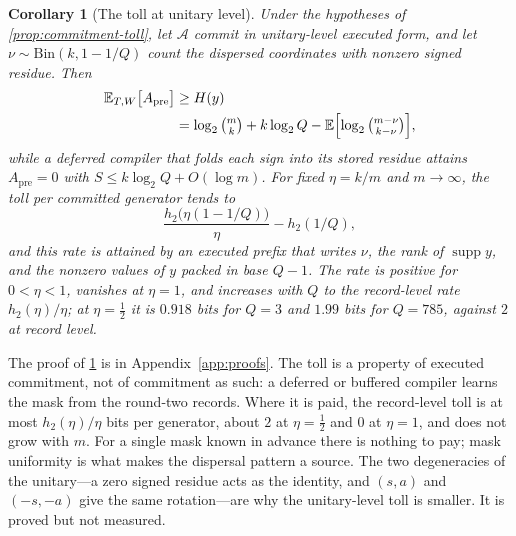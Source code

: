 \documentclass[aps,prx,reprint,superscriptaddress,floatfix,longbibliography]{revtex4-2}
\newtheorem{corollary}{Corollary}
\begin{document}
\begin{corollary}[The toll at unitary level]
\label{cor:unitary-toll}
Under the hypotheses of \cref{prop:commitment-toll}, let $\mathcal A$
commit in unitary-level executed form, and let
$\nu\sim\mathrm{Bin}(k,1-1/Q)$ count the dispersed coordinates with
nonzero signed residue.  Then
\begin{equation}\label{eq:unitary-toll}
\begin{aligned}
 \mathbb E_{T,W}\bigl[A_{\mathrm{pre}}\bigr]
 &\geq H(y)\\
 &=\log_2\tbinom{m}{k}+k\log_2Q
 -\mathbb E\Bigl[\log_2\tbinom{m-\nu}{k-\nu}\Bigr],
\end{aligned}
\end{equation}
while a deferred compiler that folds each sign into its stored residue
attains $A_{\mathrm{pre}}=0$ with $S\leq k\log_2Q+O(\log m)$.  For fixed
$\eta=k/m$ and $m\to\infty$, the toll per committed generator tends to
\begin{equation}\label{eq:unitary-toll-rate}
 \frac{h_2\bigl(\eta(1-1/Q)\bigr)}{\eta}-h_2(1/Q),
\end{equation}
and this rate is attained by an executed prefix that writes $\nu$, the
rank of $\operatorname{supp}y$, and the nonzero values of $y$ packed in
base $Q-1$.  The rate
is positive for $0<\eta<1$, vanishes at $\eta=1$, and increases with $Q$
to the record-level rate $h_2(\eta)/\eta$; at $\eta=\tfrac12$ it is
$0.918$ bits for $Q=3$ and $1.99$ bits for $Q=785$, against $2$ at
record level.
\end{corollary}

The proof of \cref{cor:unitary-toll} is in Appendix~\ref{app:proofs}.  The toll is a property of executed
commitment, not of commitment as such: a deferred or buffered compiler
learns the mask from the round-two records.  Where it is paid, the
record-level toll is at most $h_2(\eta)/\eta$ bits per generator, about
$2$ at $\eta=\tfrac12$ and $0$ at $\eta=1$, and does not grow with $m$.
For a single mask known in advance there is nothing to pay; mask
uniformity is what makes the dispersal pattern a source.  The two
degeneracies of the unitary---a zero signed residue acts as the identity,
and $(s,a)$ and $(-s,-a)$ give the same rotation---are why the
unitary-level toll is smaller.  It is proved but not measured.
\end{document}
